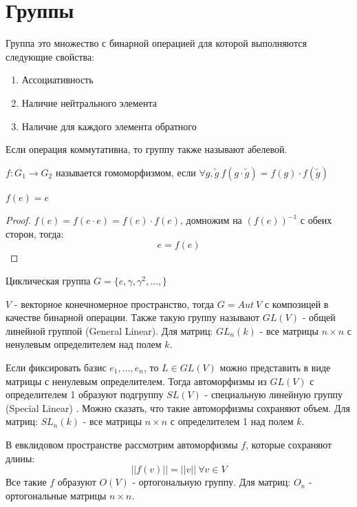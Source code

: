\section{Группы}
\begin{definition}
	Группа это множество с бинарной операцией для которой выполняются следующие свойства:
	\begin{enumerate}
		\item Ассоциативность
		\item Наличие нейтрального элемента
		\item Наличие для каждого элемента обратного
	\end{enumerate}
	Если операция коммутативна, то группу также называют абелевой.
\end{definition}

\begin{definition}
	$f: G_1 \to G_2$ называется гомоморфизмом, если $\forall g, \widetilde{g} \ f(g \cdot \widetilde{g}) = f(g) \cdot f(\widetilde{g})$
\end{definition}

\begin{prop}
	$f(e) = e$
	\begin{proof}
		$f(e) = f(e \cdot e) = f(e) \cdot f(e)$, домножим на $(f(e))^{-1}$ с обеих сторон, тогда: $$e = f(e)$$
	\end{proof}
\end{prop}

\begin{examplelist}
	\item Циклическая группа $G = \{e, \gamma, \gamma^2, \dots, \}$
	\item $V$ - векторное конечномерное пространство, тогда $G = Aut\ V$ с композицей в качестве бинарной операции.
 Также такую группу называют $GL(V)$ - общей линейной группой (General Linear). Для матриц: $GL_n(k)$ - все матрицы
 $n \times n$ с ненулевым определителем над полем $k$.
	\item Если фиксировать базис $e_1, \dots, e_n$, то $L \in GL(V)$ можно представить в виде матрицы с ненулевым определителем.
 Тогда автоморфизмы из $GL(V)$ с определителем 1 образуют подгруппу $SL(V)$ - специальную линейную группу (Special Linear)
 . Можно сказать, что такие автоморфизмы сохраняют объем. Для матриц: $SL_n(k)$ - все матрицы $n \times n$ с определителем 1 над полем $k$.
	\item В евклидовом пространстве рассмотрим автоморфизмы $f$, которые сохраняют длины: $$||f(v)|| = ||v|| \ \forall v \in V
 $$ Все такие $f$ образуют $O(V)$ - ортогональную группу. Для матриц: $O_n$ - ортогональные матрицы $n \times n$.
\end{examplelist}

